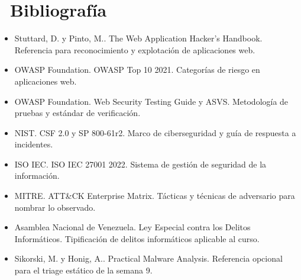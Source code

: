 \documentclass[11pt,a4paper]{article}
\newcommand{\iconotexto}[2]{\textcolor{cyanNeon}{\faIcon{#1}}~#2}
\begin{document}
\section{\iconotexto{book}{Bibliografía}}

\begin{itemize}[leftmargin=1.4em,itemsep=2pt,topsep=3pt]
  \item Stuttard, D. y Pinto, M.. The Web Application Hacker's Handbook. Referencia para reconocimiento y explotación de aplicaciones web.
  \item OWASP Foundation. OWASP Top 10 2021. Categorías de riesgo en aplicaciones web.
  \item OWASP Foundation. Web Security Testing Guide y ASVS. Metodología de pruebas y estándar de verificación.
  \item NIST. CSF 2.0 y SP 800-61r2. Marco de ciberseguridad y guía de respuesta a incidentes.
  \item ISO IEC. ISO IEC 27001 2022. Sistema de gestión de seguridad de la información.
  \item MITRE. ATT\&CK Enterprise Matrix. Tácticas y técnicas de adversario para nombrar lo observado.
  \item Asamblea Nacional de Venezuela. Ley Especial contra los Delitos Informáticos. Tipificación de delitos informáticos aplicable al curso.
  \item Sikorski, M. y Honig, A.. Practical Malware Analysis. Referencia opcional para el triage estático de la semana 9.
\end{itemize}
\end{document}
